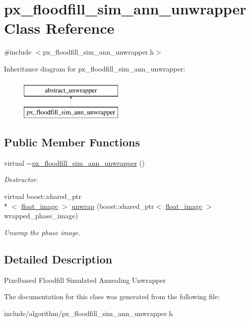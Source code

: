 \hypertarget{classpx__floodfill__sim__ann__unwrapper}{\section{px\-\_\-floodfill\-\_\-sim\-\_\-ann\-\_\-unwrapper Class Reference}
\label{classpx__floodfill__sim__ann__unwrapper}
}


{\ttfamily \#include $<$px\-\_\-floodfill\-\_\-sim\-\_\-ann\-\_\-unwrapper.\-h$>$}

Inheritance diagram for px\-\_\-floodfill\-\_\-sim\-\_\-ann\-\_\-unwrapper\-:\begin{figure}[H]
\begin{center}
\leavevmode
\includegraphics[height=2.000000cm]{classpx__floodfill__sim__ann__unwrapper}
\end{center}
\end{figure}
\subsection*{Public Member Functions}
\begin{DoxyCompactItemize}
\item 
\hypertarget{classpx__floodfill__sim__ann__unwrapper_a17701400748a2699309cc00c2056bd15}{virtual \hyperlink{classpx__floodfill__sim__ann__unwrapper_a17701400748a2699309cc00c2056bd15}{$\sim$px\-\_\-floodfill\-\_\-sim\-\_\-ann\-\_\-unwrapper} ()}\label{classpx__floodfill__sim__ann__unwrapper_a17701400748a2699309cc00c2056bd15}

\begin{DoxyCompactList}\small\item\em Destructor. \end{DoxyCompactList}\item 
\hypertarget{classpx__floodfill__sim__ann__unwrapper_a72c5c9cb7f151f50042b3d17f8b10b79}{virtual boost\-::shared\-\_\-ptr\\*
$<$ \hyperlink{classfloat__image}{float\-\_\-image} $>$ \hyperlink{classpx__floodfill__sim__ann__unwrapper_a72c5c9cb7f151f50042b3d17f8b10b79}{unwrap} (boost\-::shared\-\_\-ptr$<$ \hyperlink{classfloat__image}{float\-\_\-image} $>$ wrapped\-\_\-phase\-\_\-image)}\label{classpx__floodfill__sim__ann__unwrapper_a72c5c9cb7f151f50042b3d17f8b10b79}

\begin{DoxyCompactList}\small\item\em Unwrap the phase image. \end{DoxyCompactList}\end{DoxyCompactItemize}


\subsection{Detailed Description}
Pixelbased Floodfill Simulated Annealing Unwrapper 

The documentation for this class was generated from the following file\-:\begin{DoxyCompactItemize}
\item 
include/algorithm/px\-\_\-floodfill\-\_\-sim\-\_\-ann\-\_\-unwrapper.\-h\end{DoxyCompactItemize}
